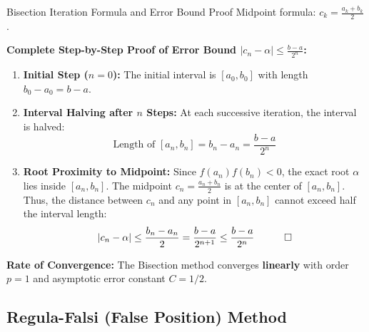 \documentclass[11pt,a4paper]{article}
\begin{document}
\begin{formulabox}{Bisection Iteration Formula and Error Bound Proof}
Midpoint formula: $c_k = \frac{a_k + b_k}{2}$.

\textbf{Complete Step-by-Step Proof of Error Bound $|c_n - \alpha| \le \frac{b-a}{2^n}$:}
\begin{enumerate}
    \item \textbf{Initial Step ($n=0$):} The initial interval is $[a_0, b_0]$ with length $b_0 - a_0 = b - a$.
    \item \textbf{Interval Halving after $n$ Steps:} At each successive iteration, the interval is halved:
    $$\text{Length of } [a_n, b_n] = b_n - a_n = \frac{b - a}{2^n}$$
    \item \textbf{Root Proximity to Midpoint:} Since $f(a_n) f(b_n) < 0$, the exact root $\alpha$ lies inside $[a_n, b_n]$. The midpoint $c_n = \frac{a_n + b_n}{2}$ is at the center of $[a_n, b_n]$. Thus, the distance between $c_n$ and any point in $[a_n, b_n]$ cannot exceed half the interval length:
    \begin{equation}
        |c_n - \alpha| \le \frac{b_n - a_n}{2} = \frac{b - a}{2^{n+1}} \le \frac{b - a}{2^n} \quad \qed
    \end{equation}
\end{enumerate}
\textbf{Rate of Convergence:} The Bisection method converges \textbf{linearly} with order $p = 1$ and asymptotic error constant $C = 1/2$.
\end{formulabox}

\newpage

\subsection{Regula-Falsi (False Position) Method}

\begin{center}
\end{center}
\end{document}
